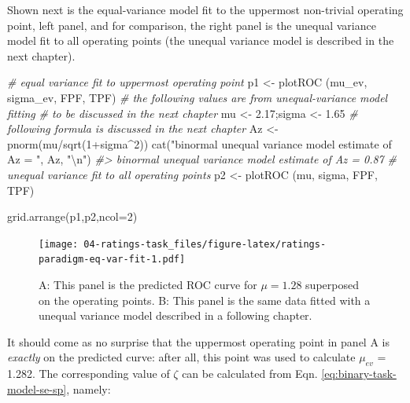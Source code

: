 \documentclass[
]{book}
\newenvironment{Shaded}{\begin{snugshade}}{\end{snugshade}}
\newcommand{\AttributeTok}[1]{\textcolor[rgb]{0.77,0.63,0.00}{#1}}
\newcommand{\CommentTok}[1]{\textcolor[rgb]{0.56,0.35,0.01}{\textit{#1}}}
\newcommand{\DecValTok}[1]{\textcolor[rgb]{0.00,0.00,0.81}{#1}}
\newcommand{\FloatTok}[1]{\textcolor[rgb]{0.00,0.00,0.81}{#1}}
\newcommand{\FunctionTok}[1]{\textcolor[rgb]{0.00,0.00,0.00}{#1}}
\newcommand{\NormalTok}[1]{#1}
\newcommand{\OtherTok}[1]{\textcolor[rgb]{0.56,0.35,0.01}{#1}}
\newcommand{\SpecialCharTok}[1]{\textcolor[rgb]{0.00,0.00,0.00}{#1}}
\newcommand{\StringTok}[1]{\textcolor[rgb]{0.31,0.60,0.02}{#1}}
\begin{document}
Shown next is the equal-variance model fit to the uppermost non-trivial operating point, left panel, and for comparison, the right panel is the unequal variance model fit to all operating points (the unequal variance model is described in the next chapter).

\begin{Shaded}
\begin{Highlighting}[]
\CommentTok{\# equal variance fit to uppermost operating point}
\NormalTok{p1 }\OtherTok{\textless{}{-}} \FunctionTok{plotROC}\NormalTok{ (mu\_ev, sigma\_ev, FPF, TPF)}
\CommentTok{\# the following values are from unequal{-}variance model fitting}
\CommentTok{\# to be discussed in the next chapter}
\NormalTok{mu }\OtherTok{\textless{}{-}} \FloatTok{2.17}\NormalTok{;sigma }\OtherTok{\textless{}{-}} \FloatTok{1.65}
\CommentTok{\# following formula is discussed in the next chapter}
\NormalTok{Az }\OtherTok{\textless{}{-}} \FunctionTok{pnorm}\NormalTok{(mu}\SpecialCharTok{/}\FunctionTok{sqrt}\NormalTok{(}\DecValTok{1}\SpecialCharTok{+}\NormalTok{sigma}\SpecialCharTok{\^{}}\DecValTok{2}\NormalTok{))}
\FunctionTok{cat}\NormalTok{(}\StringTok{"binormal unequal variance model estimate of Az = "}\NormalTok{, Az, }\StringTok{"}\SpecialCharTok{\textbackslash{}n}\StringTok{"}\NormalTok{)}
\CommentTok{\#\textgreater{} binormal unequal variance model estimate of Az =  0.87}
\CommentTok{\# unequal variance fit to all operating points}
\NormalTok{p2 }\OtherTok{\textless{}{-}} \FunctionTok{plotROC}\NormalTok{ (mu, sigma, FPF, TPF)}
\end{Highlighting}
\end{Shaded}

\begin{Shaded}
\begin{Highlighting}[]
\FunctionTok{grid.arrange}\NormalTok{(p1,p2,}\AttributeTok{ncol=}\DecValTok{2}\NormalTok{)}
\end{Highlighting}
\end{Shaded}

\begin{figure}
\centering
\texttt{[image: 04-ratings-task\_files/figure-latex/ratings-paradigm-eq-var-fit-1.pdf]}
\caption{\label{fig:ratings-paradigm-eq-var-fit}A: This panel is the predicted ROC curve for \(\mu=1.28\) superposed on the operating points. B: This panel is the same data fitted with a unequal variance model described in a following chapter.}
\end{figure}

It should come as no surprise that the uppermost operating point in panel A is \emph{exactly} on the predicted curve: after all, this point was used to calculate \(\mu_{ev}\) = 1.282. The corresponding value of \(\zeta\) can be calculated from Eqn. \eqref{eq:binary-task-model-se-sp}, namely:
\end{document}

